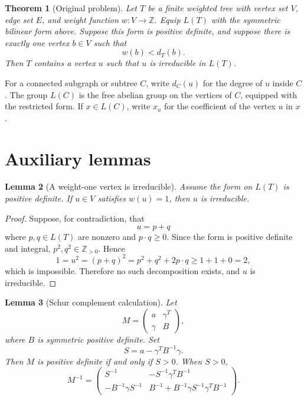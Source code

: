 \documentclass[12pt]{article}
\newcommand{\Z}{\mathbb{Z}}
\newtheorem{theorem}{Theorem}
\newtheorem{lemma}[theorem]{Lemma}
\begin{document}
\begin{theorem}[Original problem]\label{thm:main}
Let \(T\) be a finite weighted tree with vertex set \(V\), edge set \(E\), and weight function \(w:V\to\Z\). Equip \(L(T)\) with the symmetric bilinear form above. Suppose this form is positive definite, and suppose there is exactly one vertex \(b\in V\) such that
\[
w(b)<d_T(b).
\]
Then \(T\) contains a vertex \(u\) such that \(u\) is irreducible in \(L(T)\).
\end{theorem}

For a connected subgraph or subtree \(C\), write \(d_C(u)\) for the degree of \(u\) inside \(C\). The group \(L(C)\) is the free abelian group on the vertices of \(C\), equipped with the restricted form. If \(x\in L(C)\), write \(x_u\) for the coefficient of the vertex \(u\) in \(x\).

\section*{Auxiliary lemmas}

\begin{lemma}[A weight-one vertex is irreducible]\label{lem:weight-one}
Assume the form on \(L(T)\) is positive definite. If \(u\in V\) satisfies \(w(u)=1\), then \(u\) is irreducible.
\end{lemma}

\begin{proof}
Suppose, for contradiction, that
\[
u=p+q
\]
where \(p,q\in L(T)\) are nonzero and \(p\cdot q\ge 0\). Since the form is positive definite and integral, \(p^2,q^2\in\Z_{>0}\). Hence
\[
1=u^2=(p+q)^2=p^2+q^2+2p\cdot q
\ge 1+1+0=2,
\]
which is impossible. Therefore no such decomposition exists, and \(u\) is irreducible.
\end{proof}

\begin{lemma}[Schur complement calculation]\label{lem:schur}
Let
\[
M=
\begin{pmatrix}
a & \gamma^T\\
\gamma & B
\end{pmatrix},
\]
where \(B\) is symmetric positive definite. Set
\[
S=a-\gamma^T B^{-1}\gamma.
\]
Then \(M\) is positive definite if and only if \(S>0\). When \(S>0\),
\[
M^{-1}=
\begin{pmatrix}
S^{-1} & -S^{-1}\gamma^T B^{-1}\\
-B^{-1}\gamma S^{-1} &
B^{-1}+B^{-1}\gamma S^{-1}\gamma^T B^{-1}
\end{pmatrix}.
\]
\end{lemma}
\end{document}
